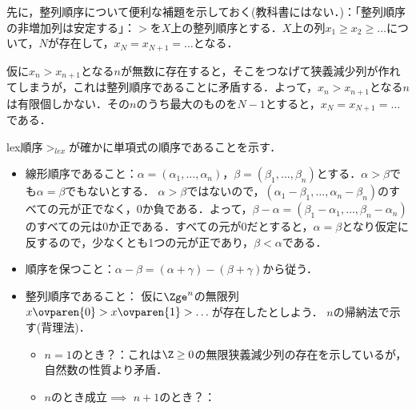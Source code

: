 先に，整列順序について便利な補題を示しておく(教科書にはない．)：「整列順序の非増加列は安定する」：$>$を$X$上の整列順序とする．$X$上の列$x_1\ge x_2 \ge \dots$について，$N$が存在して，$x_N = x_{N+1} = \dots$となる．
\begin{myproof}
 仮に$x_n > x_{n+1}$となる$n$が無数に存在すると，そこをつなげて狭義減少列が作れてしまうが，これは整列順序であることに矛盾する．よって，$x_n > x_{n+1}$となる$n$は有限個しかない．その$n$のうち最大のものを$N-1$とすると，$x_N = x_{N+1} = \dots$である．
\end{myproof}

lex順序$>_{lex}$が確かに単項式の順序であることを示す．
\begin{myproof}
 \begin{itemize}
  \item 線形順序であること：$\alpha = (\alpha_1,\dots,\alpha_n)$，$\beta = (\beta_1,\dots,\beta_n)$とする．$\alpha > \beta$でも$\alpha = \beta$でもないとする．
$\alpha > \beta$ではないので，$(\alpha_1-\beta_1,\dots,\alpha_n-\beta_n)$のすべての元が正でなく，0か負である．よって，$\beta-\alpha = (\beta_1-\alpha_1,\dots,\beta_n-\alpha_n)$のすべての元は0か正である．すべての元が0だとすると，$\alpha = \beta$となり仮定に反するので，少なくとも1つの元が正であり，$\beta < \alpha$である．
  \item 順序を保つこと：$\alpha-\beta = (\alpha+\gamma)-(\beta+\gamma)$から従う．
  \item 整列順序であること：
仮に$\Zge^n$の無限列$x\ovparen{0}>x\ovparen{1}>\dots$が存在したとしよう．
$n$の帰納法で示す(背理法)．
\begin{itemize}
 \item $n=1$のとき？：これは$\Z\ge 0$の無限狭義減少列の存在を示しているが，自然数の性質より矛盾．
 \item $n$のとき成立$\implies$ $n+1$のとき？：

\end{itemize}
\end{itemize}
\end{myproof}
